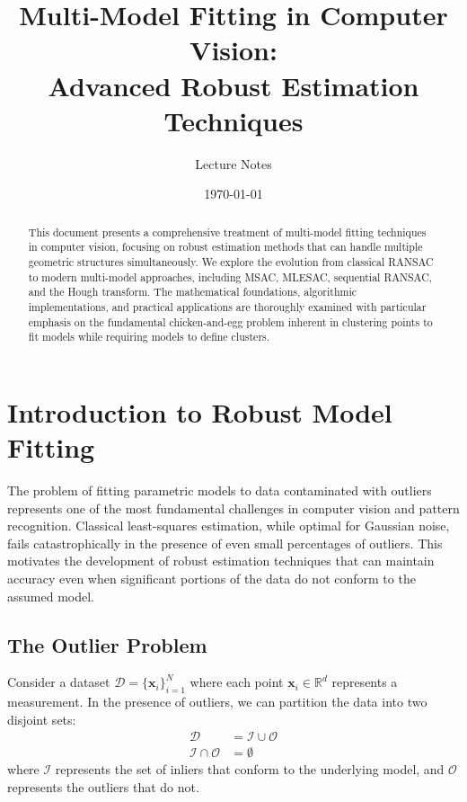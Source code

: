 \documentclass[12pt]{article}
\title{Multi-Model Fitting in Computer Vision:\\ Advanced Robust Estimation Techniques}
\author{Lecture Notes}
\date{\today}
\renewcommand{\vec}[1]{\mathbf{#1}}
\begin{document}
\maketitle

\begin{abstract}
    This document presents a comprehensive treatment of multi-model fitting techniques in computer vision, focusing on robust estimation methods that can handle multiple geometric structures simultaneously. We explore the evolution from classical RANSAC to modern multi-model approaches, including MSAC, MLESAC, sequential RANSAC, and the Hough transform. The mathematical foundations, algorithmic implementations, and practical applications are thoroughly examined with particular emphasis on the fundamental chicken-and-egg problem inherent in clustering points to fit models while requiring models to define clusters.
\end{abstract}

\tableofcontents

\newpage

\section{Introduction to Robust Model Fitting}
\label{sec:introduction}

The problem of fitting parametric models to data contaminated with outliers represents one of the most fundamental challenges in computer vision and pattern recognition. Classical least-squares estimation, while optimal for Gaussian noise, fails catastrophically in the presence of even small percentages of outliers. This motivates the development of robust estimation techniques that can maintain accuracy even when significant portions of the data do not conform to the assumed model.

\subsection{The Outlier Problem}
\label{subsec:outlier_problem}

Consider a dataset $\mathcal{D} = \{\vec{x}_i\}_{i=1}^N$ where each point $\vec{x}_i \in \mathbb{R}^d$ represents a measurement. In the presence of outliers, we can partition the data into two disjoint sets:
\begin{align}
    \mathcal{D}                  & = \mathcal{I} \cup \mathcal{O} \label{eq:data_partition} \\
    \mathcal{I} \cap \mathcal{O} & = \emptyset \label{eq:disjoint_sets}
\end{align}
where $\mathcal{I}$ represents the set of inliers that conform to the underlying model, and $\mathcal{O}$ represents the outliers that do not.
\end{document}
